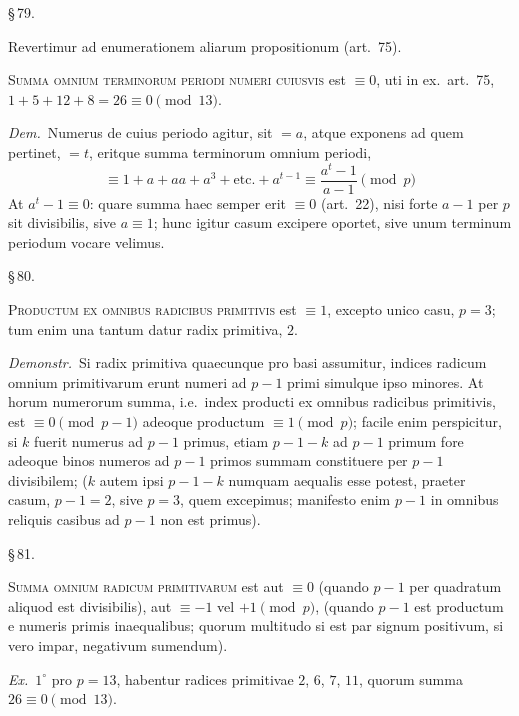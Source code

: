 \documentclass[12pt,a4paper]{article}
\theoremstyle{plain}
\theoremstyle{definition}
\theoremstyle{remark}
\begin{document}
\begin{center}\S\,79.\end{center}

Revertimur ad enumerationem aliarum propositionum (art.~75).

\textsc{Summa omnium terminorum periodi numeri cuiusvis} est $\equiv 0$, uti in ex.\ art.~75, $1 + 5 + 12 + 8 = 26 \equiv 0 \pmod{13}$.

\textit{Dem.}\ Numerus de cuius periodo agitur, sit $= a$, atque exponens ad quem pertinet, $= t$, eritque summa terminorum omnium periodi,
\[
\equiv 1 + a + aa + a^3 + \text{etc.} + a^{t-1} \equiv \frac{a^t - 1}{a - 1} \pmod{p}
\]
At $a^t - 1 \equiv 0$: quare summa haec semper erit $\equiv 0$ (art.~22), nisi forte $a - 1$ per $p$ sit divisibilis, sive $a \equiv 1$; hunc igitur casum excipere oportet, sive unum terminum periodum vocare velimus.

\begin{center}\S\,80.\end{center}

\textsc{Productum ex omnibus radicibus primitivis} est $\equiv 1$, excepto unico casu, $p = 3$; tum enim una tantum datur radix primitiva, $2$.

\textit{Demonstr.}\ Si radix primitiva quaecunque pro basi assumitur, indices radicum omnium primitivarum erunt numeri ad $p-1$ primi simulque ipso minores. At horum numerorum summa, i.e.\ index producti ex omnibus radicibus primitivis, est $\equiv 0 \pmod{p-1}$ adeoque productum $\equiv 1 \pmod{p}$; facile enim perspicitur, si $k$ fuerit numerus ad $p-1$ primus, etiam $p-1-k$ ad $p-1$ primum fore adeoque binos numeros ad $p-1$ primos summam constituere per $p-1$ divisibilem; ($k$ autem ipsi $p-1-k$ numquam aequalis esse potest, praeter casum, $p-1 = 2$, sive $p = 3$, quem excepimus; manifesto enim $p-1$ in omnibus reliquis casibus ad $p-1$ non est primus).

\begin{center}\S\,81.\end{center}

\textsc{Summa omnium radicum primitivarum} est aut $\equiv 0$ (quando $p-1$ per quadratum aliquod est divisibilis), aut $\equiv -1$ vel $+1 \pmod{p}$, (quando $p-1$ est productum e numeris primis inaequalibus; quorum multitudo si est par signum positivum, si vero impar, negativum sumendum).

\textit{Ex.}\ $1^\circ$ pro $p = 13$, habentur radices primitivae $2$, $6$, $7$, $11$, quorum summa $26 \equiv 0 \pmod{13}$.
\end{document}
